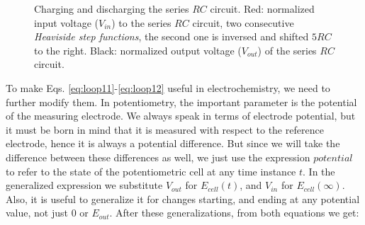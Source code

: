 \begin{figure}
\centering
{}
\caption[Charging and discharging the series $RC$ circuit.]{Charging and discharging the series $RC$ circuit.
Red: normalized input voltage ($V_{in}$) to the series $RC$ circuit, two consecutive \emph{Heaviside step functions}, the second one is inversed and shifted $5RC$ to the right.
Black: normalized output voltage ($V_{out}$) of the series $RC$ circuit.}
\label{fig:charge_discharge}
\end{figure}

To make Eqs. \ref{eq:loop11}-\ref{eq:loop12} useful in electrochemistry, we need to further modify them.
In potentiometry, the important parameter is the potential of the measuring electrode.
We always speak in terms of electrode potential, but it must be born in mind that it is measured with respect to the reference electrode, hence it is always a potential difference.
But since we will take the difference between these differences as well, we just use the expression $potential$ to refer to the state of the potentiometric cell at any time instance $t$.
In the generalized expression we substitute $V_{out}$ for $E_{cell}(t)$, and $V_{in}$ for $E_{cell}(\infty)$.
Also, it is useful to generalize it for changes starting, and ending at any potential value, not just $0$ or $E_{out}$.
After these generalizations, from both equations we get:


